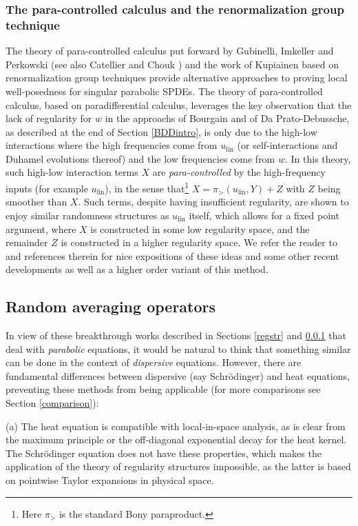 \documentclass[11 pt,reqno]{amsart}
\theoremstyle{definition}
\theoremstyle{remark}
\numberwithin{equation}{section}
\begin{document}
\subsubsection{The para-controlled calculus and the renormalization group technique}\label{paracon} The theory of para-controlled calculus put forward by Gubinelli, Imkeller and Perkowski \cite{GIP} (see also Catellier and Chouk \cite{CCh}) and the work of  Kupiainen \cite{Kupia} based on renormalization group techniques provide alternative approaches to proving local well-posedness for singular parabolic SPDEs. The theory of para-controlled calculus, based on paradifferential calculus, leverages the key observation that the lack of regularity for $w$ in the approachs of Bourgain and of Da Prato-Debussche, as described at the end of Section \ref{BDDintro}, is only due to the high-low interactions where the high frequencies come from $u_{\mathrm{lin}}$ (or self-interactions and Duhamel evolutions thereof) and the low frequencies come from $w$. In this theory, such high-low interaction terms $X$ are \emph{para-controlled} by the high-frequency inputs (for example $u_{\mathrm{lin}}$), in the sense that\footnote{Here $\pi_>$ is the standard Bony paraproduct.} $X=\pi_>(u_{\mathrm{lin}},Y)+Z$ with $Z$ being smoother than $X$. Such terms, despite having insufficient regularity, are shown to enjoy similar randomness structures as $u_{\mathrm{lin}}$ itself, which allows for a fixed point argument, where $X$ is constructed in some low regularity space, and the remainder $Z$ is constructed in a higher regularity space. We refer the reader to \cite{CCh,GP, GP2, GP4, MouWe3, BaBe, BaBe2,GKO,Br} and references therein for nice expositions of these ideas and some other recent developments as well as a higher order variant of this method.
\subsection{Random averaging operators}\label{rao0} In view of these breakthrough works described in Sections \ref{regstr} and \ref{paracon} that deal with \emph{parabolic} equations, it would be natural to think that something similar can be done in the context of \emph{dispersive} equations. However, there are fundamental differences between dispersive (say Schr\"{o}dinger) and heat equations, preventing these methods from being applicable (for more comparisons see Section \ref{comparison}):

(a) The heat equation is compatible with local-in-space analysis, as is clear from the maximum principle or the off-diagonal exponential decay for the heat kernel. The Schr\"{o}dinger equation does not have these properties, which makes the application of the theory of regularity structures impossible, as the latter is based on pointwise Taylor expansions in physical space.
\end{document}

